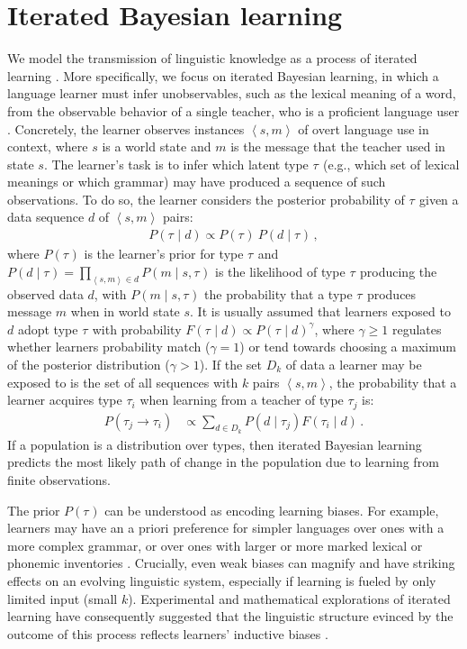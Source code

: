 \documentclass[10pt,a4paper]{article}
\newcommand{\tuple}[1]{\ensuremath{\left\langle #1 \right\rangle}}
\newcommand{\type}[1]{\ensuremath{\tau_{#1}}}
\newcommand{\postparameter}{\ensuremath{\gamma}}
\begin{document}
\section{Iterated Bayesian learning}

We model the transmission of linguistic knowledge as a process of iterated learning \citep{kirby+etal:2014, tamariz+kirby:2016}.
More specifically, we focus on
iterated Bayesian learning, in which a language learner must infer unobservables, such as the
lexical meaning of a word, from the observable behavior of a single teacher, who is a
proficient language user \citep[e.g.][]{griffiths+kalish:2007,kirby+etal:2007}. Concretely, the
learner observes instances $\tuple{s,m}$ of overt language use in context, where $s$ is a world state
and $m$ is the message that the teacher used in state $s$. The learner's task is to infer which
latent type \type{} (e.g., which set of lexical meanings or which grammar) may have produced a
sequence of such observations. To do so, the learner considers the posterior probability of \type{} given a data sequence $d$ of $\tuple{s, m}$ pairs:
\begin{align*}
  P(\type{} \mid d) \propto P(\type{}) \ P(d \mid \type{})\,,
\end{align*}
where $P(\type{})$ is the learner's prior for type \type{} and
$P(d \mid \type{}) = \prod_{\tuple{s,m} \in d} P(m \mid s, \type{})$ is the likelihood of type \type{}
producing the observed data $d$, with $P(m \mid s, \type{})$ the probability that a type \type{} produces
message $m$ when in world state $s$. It is usually assumed that learners exposed to $d$ adopt
type \type{} with probability $F(\type{} \mid d) \propto P(\type{} \mid d)^\postparameter$, where $\postparameter \ge 1$ regulates
whether learners probability match ($\postparameter = 1$) or tend towards choosing a maximum of the
posterior distribution ($\postparameter > 1$). If the set $D_k$ of data a learner may be exposed to is the
set of all sequences with $k$ pairs $\tuple{s,m}$, the probability that a learner acquires type
\type{i} when learning from a teacher of type \type{j} is:
\begin{align*}
  P(\type{j} \rightarrow \type{i}) &\propto \sum_{d \in D_k} P(d \mid \type{j}) F(\type{i} \mid d)\,.
\end{align*}
If a population is a distribution over types, then iterated Bayesian learning predicts the most
likely path of change in the population due to learning from finite observations.

The prior $P(\type{})$ can be understood as encoding learning biases. For example, learners may have
an a priori preference for simpler languages over ones with a more complex grammar, or over
ones with larger or more marked lexical or phonemic inventories
\citep[cf.][]{kirby+etal:2015}. Crucially, even weak biases
can magnify and have striking effects on an evolving linguistic system, especially if learning
is fueled by only limited input (small $k$). Experimental and mathematical explorations of
iterated learning have consequently suggested that the linguistic structure evinced by the outcome of this process
reflects learners' inductive biases \citep{kirby+etal:2007,kirby+etal:2014}.
\end{document}
